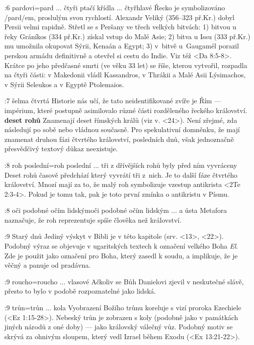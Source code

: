 :6 {pardovi}={pard ... čtyři ptačí křídla ... čtyřhlavé}
     Řecko je symbolizováno \x/pard/em, proslulým svou rychlostí.
     Alexandr Veliký (356--323 př.Kr.) dobyl Persii velmi rapidně.
     Střetl se s Peršany ve třech velkých bitvách:
     1) bitvou u řeky Gráníkos (334 př.Kr.) získal vstup do Malé Asie; 
     2) bitva u Issu (333 př.Kr.) mu umožnila okupovat Sýrii, Kenaán a Egypt; 
     3) v~bitvě u~Gaugamél porazil perskou armádu definitivně a otevřel si cestu do Indie.
        Viz též <Da 8:5-8>. Krátce po jeho předčasné smrti (ve věku 33 let) se říše, kterou
        vytvořil, rozpadla na čtyři části: v Makedonii vládl Kassandros, v Thrákii a Malé Asii
        Lýsimachos, v Sýrii Seleukos a v Egyptě Ptolemaios.

:7 {šelma čtvrtá}
     Historie nás učí, že tato neidentifikované zvíře je Řím --- impérium, které postupně
     asimilovalo různé části rozděleného řeckého království. 
     {\bf deset rohů} Znamenají deset římských králů (viz v. <24>). Není zřejmé, zda následují po
     sobě nebo vládnou současně. Pro spekulativní domněnku, že mají znamenat druhou fázi čtvrtého
     království,  posledních dnů, však jednoznačně přesvědčivý textový
     důkaz neexistuje. 

:8 {roh poslední}={roh poslední ... tři z dřívějších rohů byly před ním vyvráceny}
     Deset rohů časově předchází  který vyvrátí tři z~nich. Je to další fáze
     čtvrtého království. Mnozí mají za to, že malý roh symbolizuje vzestup antikrista 
     <2Te 2:3-4>. Pokud je tomu tak, pak je toto první zmínka o antikristu v Písmu.  

:8 {oči podobné očím lidským}{oči podobné očím lidským ... a ústa}
     Metafora naznačuje, že roh reprezentuje spíše člověka než království. 
     
:9 {Starý dnů} Jediný výskyt v Bibli je v této kapitole (srv. <13>, <22>). Podobný výraz se objevuje v ugaritských textech k označení velkého Boha  {\em El}. Zde je použit jako označení pro Boha, který zasedl k soudu, a implikuje, že je věčný a  panuje od pradávna.

:9 {roucho}={roucho ... vlasové} Ačkoliv se Bůh Danielovi zjevil v neskutečné slávě, přesto to bylo v podobě rozpoznatelné jako lidská.

:9 {trůn}={trůn ... kola} Vyobrazení Božího trůnu koreluje s vizí proroka Ezechiele (<Ez 1:15-28>).
      Nebeský trůn je zobrazen s koly (podobně jako v památkách jiných národů z oné doby) --- jako královský válečný vůz. Podobný motiv se skrývá za ohnivým sloupem, který vedl Izrael během Exodu (<Ex 13:21-22>).

